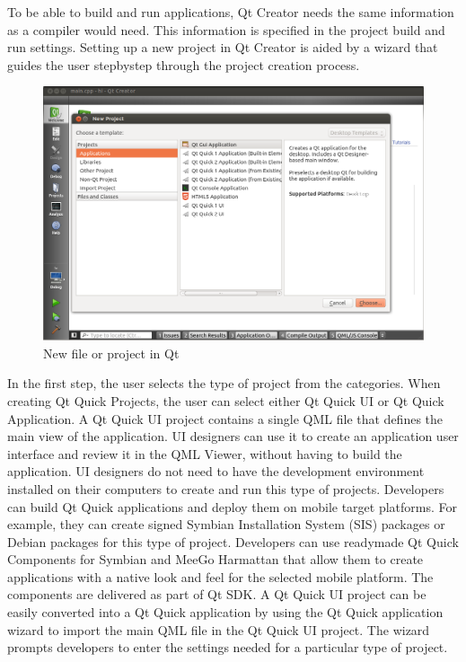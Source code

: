 To  be  able  to  build  and  run  applications,  Qt  Creator  needs  the  same  information  as  a  compiler  would
need.  This  information  is  specified  in  the  project  build  and  run  settings.  Setting  up  a  new  project  in  Qt
Creator  is  aided  by  a  wizard  that  guides  the  user  step­by­step  through  the  project  creation  process. 
\begin{figure}[htb]
\begin{center}
\includegraphics[scale=0.4]{images/new.png}
\caption{New file or project in Qt}
\end{center}
\end{figure}
In the  first  step,  the  user  selects  the  type of project from the categories. When  creating Qt Quick Projects,
the user can select either Qt Quick UI or Qt Quick Application.
A  Qt  Quick  UI  project  contains  a  single  QML  file  that  defines  the  main  view  of  the  application.  UI
designers  can  use  it  to  create  an  application  user  interface  and  review  it  in  the  QML  Viewer,  without
having  to  build  the  application.   UI  designers  do  not  need to have the development environment installed
on their computers to create and run this type of projects.
Developers  can  build  Qt  Quick  applications  and  deploy  them  on  mobile  target platforms. For example,
they  can  create  signed  Symbian  Installation  System  (SIS)  packages or Debian packages for this type of
project.  Developers  can  use  ready­made  Qt  Quick  Components  for  Symbian  and  MeeGo  Harmattan
that  allow  them  to  create  applications  with  a  native  look  and  feel  for  the  selected  mobile  platform.  The
components  are  delivered  as  part  of  Qt SDK. A Qt Quick UI project can be easily  converted into a Qt
Quick  application  by using the Qt Quick  application wizard to import the main QML file in the Qt Quick
UI project. The wizard prompts developers to enter the settings needed for a particular type of project.

